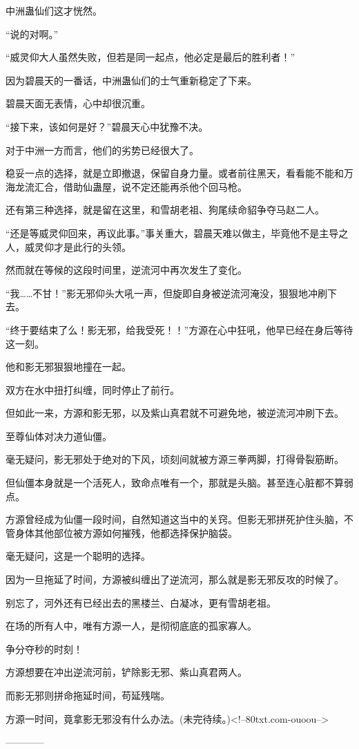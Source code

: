 \begin{this_body}
中洲蛊仙们这才恍然。

“说的对啊。”

“威灵仰大人虽然失败，但若是同一起点，他必定是最后的胜利者！”

因为碧晨天的一番话，中洲蛊仙们的士气重新稳定了下来。

碧晨天面无表情，心中却很沉重。

“接下来，该如何是好？”碧晨天心中犹豫不决。

对于中洲一方而言，他们的劣势已经很大了。

稳妥一点的选择，就是立即撤退，保留自身力量。或者前往黑天，看看能不能和万海龙流汇合，借助仙蛊屋，说不定还能再杀他个回马枪。

还有第三种选择，就是留在这里，和雪胡老祖、狗尾续命貂争夺马赵二人。

“还是等威灵仰回来，再议此事。”事关重大，碧晨天难以做主，毕竟他不是主导之人，威灵仰才是此行的头领。

然而就在等候的这段时间里，逆流河中再次发生了变化。

“我……不甘！”影无邪仰头大吼一声，但旋即自身被逆流河淹没，狠狠地冲刷下去。

“终于要结束了么！影无邪，给我受死！！”方源在心中狂吼，他早已经在身后等待这一刻。

他和影无邪狠狠地撞在一起。

双方在水中扭打纠缠，同时停止了前行。

但如此一来，方源和影无邪，以及紫山真君就不可避免地，被逆流河冲刷下去。

至尊仙体对决力道仙僵。

毫无疑问，影无邪处于绝对的下风，顷刻间就被方源三拳两脚，打得骨裂筋断。

但仙僵本身就是一个活死人，致命点唯有一个，那就是头脑。甚至连心脏都不算弱点。

方源曾经成为仙僵一段时间，自然知道这当中的关窍。但影无邪拼死护住头脑，不管身体其他部位被方源如何摧残，他都选择保护脑袋。

毫无疑问，这是一个聪明的选择。

因为一旦拖延了时间，方源被纠缠出了逆流河，那么就是影无邪反攻的时候了。

别忘了，河外还有已经出去的黑楼兰、白凝冰，更有雪胡老祖。

在场的所有人中，唯有方源一人，是彻彻底底的孤家寡人。

争分夺秒的时刻！

方源想要在冲出逆流河前，铲除影无邪、紫山真君两人。

而影无邪则拼命拖延时间，苟延残喘。

方源一时间，竟拿影无邪没有什么办法。(未完待续。)<!--80txt.com-ouoou-->

------------

\end{this_body}

